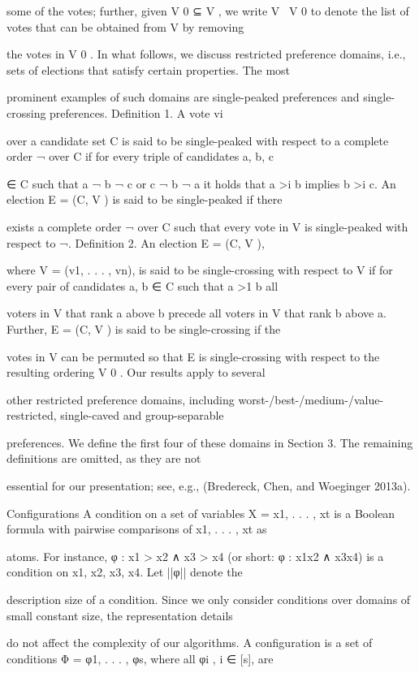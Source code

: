 \documentclass[12pt, a4paper]{report}
\begin{document}
some of the votes; further, given V 0 ⊆ V , we write V \ V 0 to denote the list of votes that can be obtained from V by removing 

the votes in V 0 .
In what follows, we discuss restricted preference domains, i.e., sets of elections that satisfy certain properties. The most 

prominent examples of such domains are single-peaked preferences and single-crossing preferences. Definition 1. A vote vi 

over a candidate set C is said to be single-peaked with respect to a complete order ¬ over C if for every triple of candidates a, b, c 

∈ C such that a ¬ b ¬ c or c ¬ b ¬ a it holds that a >i b implies b >i c. An election E = (C, V ) is said to be single-peaked if there 

exists a complete order ¬ over C such that every vote in V is single-peaked with respect to ¬. Definition 2. An election E = (C, V ), 

where V = (v1, . . . , vn), is said to be single-crossing with respect to V if for every pair of candidates a, b ∈ C such that a >1 b all 

voters in V that rank a above b precede all voters in V that rank b above a. Further, E = (C, V ) is said to be single-crossing if the 

votes in V can be permuted so that E is single-crossing with respect to the resulting ordering V 0 . Our results apply to several 

other restricted preference domains, including worst-/best-/medium-/value-restricted, single-caved and group-separable 

preferences. We define the first four of these domains in Section 3. The remaining definitions are omitted, as they are not 

essential for our presentation; see, e.g., (Bredereck, Chen, and Woeginger 2013a).

Configurations A condition on a set of variables X = {x1, . . . , xt} is a Boolean formula with pairwise comparisons of x1, . . . , xt as 

atoms. For instance, φ : x1 > x2 ∧ x3 > x4 (or short: φ : x1x2 ∧ x3x4) is a condition on {x1, x2, x3, x4}. Let ||φ|| denote the 

description size of a condition. Since we only consider conditions over domains of small constant size, the representation details 

do not affect the complexity of our algorithms. A configuration is a set of conditions Φ = {φ1, . . . , φs}, where all φi , i ∈ [s], are 
\end{document}
